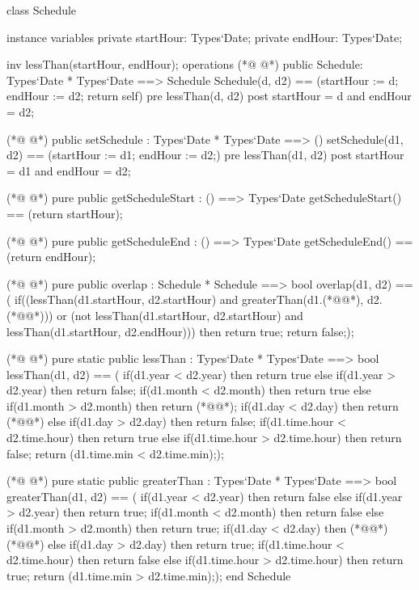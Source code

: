 \begin{vdmpp}[breaklines=true]
class Schedule

instance variables
  private startHour: Types`Date;
  private endHour: Types`Date;
  
  inv lessThan(startHour, endHour);
operations 
(*@
\label{Schedule:9}
@*)
 public Schedule: Types`Date * Types`Date ==> Schedule
  Schedule(d, d2) == (startHour := d; endHour := d2; return self)
 pre lessThan(d, d2)
 post startHour = d and endHour = d2;
 
(*@
\label{setSchedule:14}
@*)
 public setSchedule : Types`Date * Types`Date ==> ()
  setSchedule(d1, d2) == (startHour := d1; endHour := d2;)
 pre lessThan(d1, d2)
 post startHour = d1 and endHour = d2;
  
(*@
\label{getScheduleStart:19}
@*)
 pure public getScheduleStart : () ==> Types`Date
  getScheduleStart() == (return startHour);
  
(*@
\label{getScheduleEnd:22}
@*)
 pure public getScheduleEnd : () ==> Types`Date
  getScheduleEnd() == (return endHour);
 
(*@
\label{overlap:25}
@*)
 pure public overlap : Schedule * Schedule ==> bool
  overlap(d1, d2) == (
          if((lessThan(d1.startHour, d2.startHour) and greaterThan(d1.(*@@*), d2.(*@@*))) or
          (not lessThan(d1.startHour, d2.startHour) and lessThan(d1.startHour, d2.endHour)))
           then return true;
          return false;);

(*@
\label{lessThan:32}
@*)
 pure static public lessThan : Types`Date * Types`Date ==> bool
  lessThan(d1, d2) == (
          if(d1.year < d2.year)
           then return true
          else if(d1.year > d2.year)
           then return false;
          if(d1.month < d2.month)
           then return true
          else if(d1.month > d2.month)
           then return (*@@*);
          if(d1.day < d2.day)
           then return (*@@*)
          else if(d1.day > d2.day)
           then return false;
          if(d1.time.hour < d2.time.hour)
           then return true
          else if(d1.time.hour > d2.time.hour)
           then return false;
          return (d1.time.min < d2.time.min););
          
(*@
\label{greaterThan:52}
@*)
 pure static public greaterThan : Types`Date * Types`Date ==> bool
  greaterThan(d1, d2) == (
          if(d1.year < d2.year)
           then return false
          else if(d1.year > d2.year)
           then return true;
          if(d1.month < d2.month)
           then return false
          else if(d1.month > d2.month)
           then return true;
          if(d1.day < d2.day)
           then (*@@*) (*@@*)
          else if(d1.day > d2.day)
           then return true;
          if(d1.time.hour < d2.time.hour)
           then return false
          else if(d1.time.hour > d2.time.hour)
           then return true;
          return (d1.time.min > d2.time.min););
end Schedule
\end{vdmpp}
